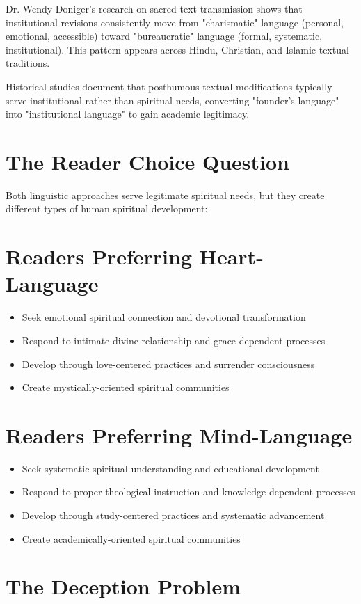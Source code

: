 \documentclass[11pt,twoside]{book}
\begin{document}
Dr. Wendy Doniger's research on sacred text transmission shows that institutional revisions consistently move from "charismatic" language (personal, emotional, accessible) toward "bureaucratic" language (formal, systematic, institutional). This pattern appears across Hindu, Christian, and Islamic textual traditions.

Historical studies document that posthumous textual modifications typically serve institutional rather than spiritual needs, converting "founder's language" into "institutional language" to gain academic legitimacy.
\section*{The Reader Choice Question}
\label{sec:org054e43a}

Both linguistic approaches serve legitimate spiritual needs, but they create different types of human spiritual development:
\section*{Readers Preferring Heart-Language}
\label{sec:org62873a3}
\begin{itemize}
\item Seek emotional spiritual connection and devotional transformation
\item Respond to intimate divine relationship and grace-dependent processes
\item Develop through love-centered practices and surrender consciousness
\item Create mystically-oriented spiritual communities
\end{itemize}
\section*{Readers Preferring Mind-Language}
\label{sec:org93b45f8}
\begin{itemize}
\item Seek systematic spiritual understanding and educational development
\item Respond to proper theological instruction and knowledge-dependent processes
\item Develop through study-centered practices and systematic advancement
\item Create academically-oriented spiritual communities
\end{itemize}
\section*{The Deception Problem}
\label{sec:org6f6f4f5}
\end{document}
